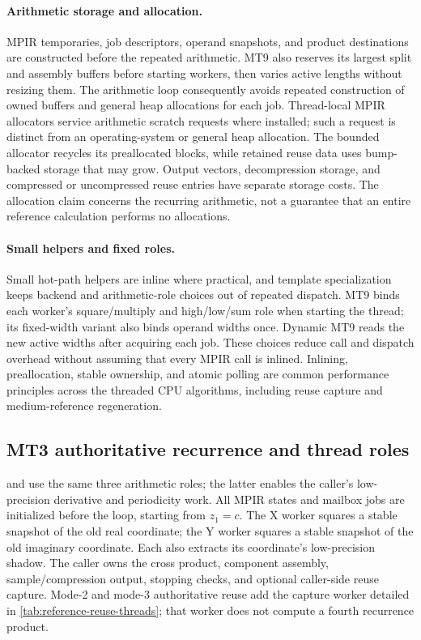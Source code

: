 \paragraph{Arithmetic storage and allocation.}
MPIR temporaries, job descriptors, operand snapshots, and product destinations
are constructed before the repeated arithmetic. MT9 also reserves its largest
split and assembly buffers before starting workers, then varies active lengths
without resizing them. The arithmetic loop consequently avoids repeated
construction of owned buffers and general heap allocations for each job.
Thread-local MPIR allocators service arithmetic scratch requests where installed;
such a request is distinct from an operating-system or general heap allocation.
The bounded allocator recycles its preallocated blocks, while retained reuse
data uses bump-backed storage that may grow. Output vectors, decompression
storage, and compressed or uncompressed reuse entries have separate storage
costs. The allocation claim concerns the recurring arithmetic, not a guarantee
that an entire reference calculation performs no allocations.

\paragraph{Small helpers and fixed roles.}
Small hot-path helpers are inline where practical, and template specialization
keeps backend and arithmetic-role choices out of repeated dispatch. MT9 binds
each worker's square/multiply and high/low/sum role when starting the thread;
its fixed-width variant also binds operand widths once. Dynamic MT9 reads the
new active widths after acquiring each job. These choices reduce call and
dispatch overhead without assuming that every MPIR call is inlined. Inlining,
preallocation, stable ownership, and atomic polling are common performance
principles across the threaded CPU algorithms, including reuse capture and
medium-reference regeneration.

\subsection{MT3 authoritative recurrence and thread roles}
\label{subsec:ref-orbit-mt3}

 and  use the same three arithmetic roles;
the latter enables the caller's low-precision derivative and periodicity work.
All MPIR states and mailbox jobs are initialized before the loop, starting
from $z_1=c$. The X worker squares a stable snapshot of the old real coordinate;
the Y worker squares a stable snapshot of the old imaginary coordinate. Each also
extracts its coordinate's low-precision shadow. The caller owns the cross
product, component assembly, sample/compression output, stopping checks, and
optional caller-side reuse capture. Mode-2 and mode-3 authoritative reuse add
the capture worker detailed in \cref{tab:reference-reuse-threads}; that worker
does not compute a fourth recurrence product.

